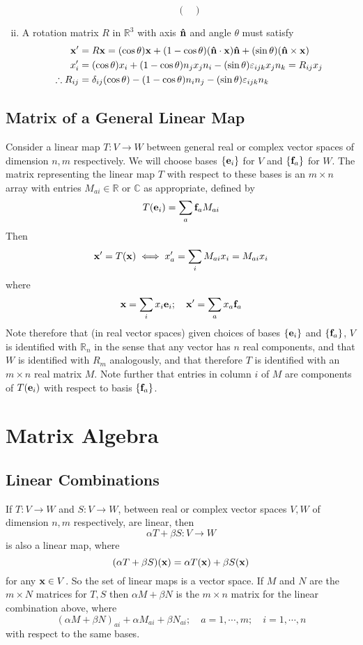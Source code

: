 \documentclass{article}
\begin{document}
\begin{enumerate}[(i)]
\[\begin{pmatrix}
		      \end{pmatrix} \]
	\item A rotation matrix $R$ in $\mathbb R^3$ with axis $\vu n$ and angle $\theta$ must satisfy
	      \begin{align*}
		      \vb x'            & = R\vb x = (\cos \theta)\vb x + (1 - \cos \theta)(\vu n \cdot \vb x)\vu n + (\sin \theta)(\vu n \times \vb x) \\
		      x_i'              & = (\cos \theta)x_i + (1 - \cos \theta)n_j x_j n_i - (\sin \theta) \varepsilon_{ijk}x_j n_k = R_{ij} x_j       \\
		      \therefore R_{ij} & = \delta_{ij}(\cos \theta) - (1 - \cos \theta)n_in_j - (\sin \theta)\varepsilon_{ijk} n_k
	      \end{align*}
\end{enumerate}

\subsection{Matrix of a General Linear Map}
Consider a linear map $T: V \to W$ between general real or complex vector spaces of dimension $n, m$ respectively. We will choose bases $\{ \vb e_i \}$ for $V$ and $\{ \vb f_a \}$ for $W$. The matrix representing the linear map $T$ with respect to these bases is an $m \times n$ array with entries $M_{ai} \in \mathbb R$ or $\mathbb C$ as appropriate, defined by
\[ T(\vb e_i) = \sum_a \vb f_a M_{ai} \]
Then
\[ \vb x' = T(\vb x) \iff x_a' = \sum_i M_{ai}x_i = M_{ai}x_i \]
where
\[ \vb x = \sum_i x_i \vb e_i;\quad \vb x' = \sum_a x_a \vb f_a \]
Note therefore that (in real vector spaces) given choices of bases $\{ \vb e_i \}$ and $\{ \vb f_a \}$, $V$ is identified with $\mathbb R_n$ in the sense that any vector has $n$ real components, and that $W$ is identified with $R_m$ analogously, and that therefore $T$ is identified with an $m\times n$ real matrix $M$. Note further that entries in column $i$ of $M$ are components of $T(\vb e_i)$ with respect to basis $\{ \vb f_a \}$.

\section{Matrix Algebra}
\subsection{Linear Combinations}
If $T: V \to W$ and $S: V \to W$, between real or complex vector spaces $V, W$ of dimension $n, m$ respectively, are linear, then
\[ \alpha T + \beta S: V \to W \]
is also a linear map, where
\[ (\alpha T + \beta S)(\vb x) = \alpha T(\vb x) + \beta S(\vb x) \]
for any $\vb x \in V$. So the set of linear maps is a vector space. If $M$ and $N$ are the $m\times N$ matrices for $T, S$ then $\alpha M + \beta N$ is the $m\times n$ matrix for the linear combination above, where
\[ (\alpha M + \beta N)_{ai} + \alpha M_{ai} + \beta N_{ai};\quad a = 1, \cdots, m;\quad i = 1, \cdots, n \]
with respect to the same bases.
\end{document}
